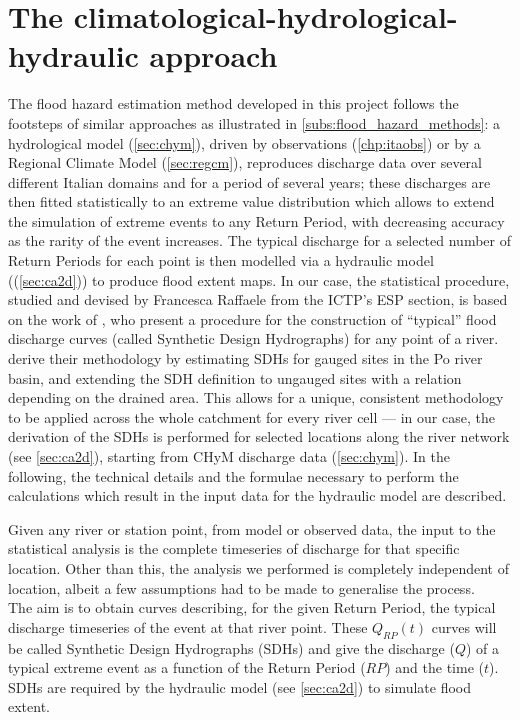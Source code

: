 \section{The climatological-hydrological-hydraulic approach} \label{sec:3_mod_apprach}
The flood hazard estimation method developed in this project follows the footsteps of similar approaches as illustrated in \cref{subs:flood_hazard_methods}: a hydrological model (\cref{sec:chym}), driven by observations (\cref{chp:itaobs}) or by a Regional Climate Model (\cref{sec:regcm}), reproduces discharge data over several different Italian domains and for a period of several years; these discharges are then fitted statistically to an extreme value distribution which allows to extend the simulation of extreme events to any Return Period, with decreasing accuracy as the rarity of the event increases.
The typical discharge for a selected number of Return Periods for each point is then modelled via a hydraulic model ((\cref{sec:ca2d})) to produce flood extent maps.
In our case, the statistical procedure, studied and devised by Francesca Raffaele from the ICTP's ESP section, is based on the work of \citet{Maione2003}, who present a procedure for the construction of ``typical'' flood discharge curves (called Synthetic Design Hydrographs) for any point of a river.
\citet{Maione2003} derive their methodology by estimating SDHs for gauged sites in the Po river basin, and extending the SDH definition to ungauged sites with a relation depending on the drained area.
This allows for a unique, consistent methodology to be applied across the whole catchment for every river cell --- in our case, the derivation of the SDHs is performed for selected locations along the river network (see \cref{sec:ca2d}), starting from CHyM discharge data (\cref{sec:chym}).
In the following, the technical details and the formulae necessary to perform the calculations which result in the input data for the hydraulic model are described.

Given any river or station point, from model or observed data, the input to the statistical analysis is the complete timeseries of discharge for that specific location. Other than this, the analysis we performed is completely independent of location, albeit a few assumptions had to be made to generalise the process.\\
The aim is to obtain curves describing, for the given Return Period, the typical discharge timeseries of the event at that river point. These $Q_{RP}(t)$ curves will be called Synthetic Design Hydrographs (SDHs) and give the discharge ($Q$) of a typical extreme event as a function of the Return Period ($RP$) and the time ($t$).
SDHs are required by the hydraulic model (see \cref{sec:ca2d}) to simulate flood extent.

